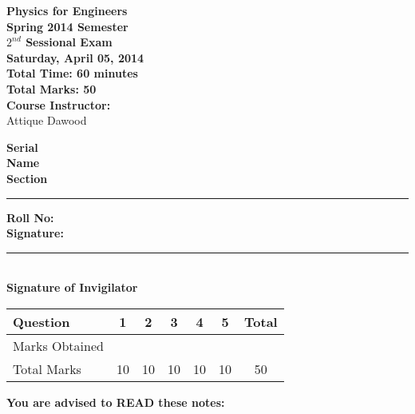 \documentclass[12pt,a4paper]{article}
\def\QOne{10}
\def\Qtwo{10}
\def\Qthree{10}
\def\Qfour{10}
\def\Qfive{10}
\def\TotalMarks{50}
\begin{document}
\begin{minipage}{0.55\textwidth}
{\LARGE \textbf{Physics for Engineers}}\\[0.15cm]
{\normalsize \textbf{Spring 2014 Semester}}\\
{\Large \textbf{$2^{nd}$ Sessional Exam}}\\
{\normalsize \textbf{Saturday, April 05, 2014}}\\[0.30cm]
{\Large \textbf{Total Time: 60 minutes}}\\[0.15cm]
{\Large \textbf{Total Marks: 50}}\\
\textbf{Course Instructor:}\\
Attique Dawood\\
\end{minipage}
\begin{minipage}{0.4\textwidth}
\textbf{Serial} \hrulefill \\[0.25cm]
\textbf{Name} \hrulefill\\[0.25cm]
\textbf{Section} \rule{1cm}{0.2mm} \textbf{Roll No:} \hrulefill\\[0.25cm]
\textbf{Signature:} \hrulefill\\[0.25cm]
\rule{6.6cm}{0.2mm}\\
\textbf{Signature of Invigilator}\\[0.25cm]
\end{minipage}
\begin{table}[H]
\begin{center}
\vspace{0.3cm}
	{\large \begin{tabular}{|l|c|c|c|c|c|c|}
	\hline
		\rule{0pt}{2.6ex} Question & \textbf{1} & \textbf{2} & \textbf{3} & \textbf{4} & \textbf{5} & \textbf{Total}\\
		\hline
		Marks Obtained \rule{0pt}{2.6ex} & & & & & &\\
		\hline
		Total Marks \rule{0pt}{2.6ex} & \QOne & \Qtwo & \Qthree & \Qfour & \Qfive & \TotalMarks\\		
	\hline
	\end{tabular}}
\end{center}
\end{table}
\noindent \textbf{You are advised to READ these notes:}
\end{document}
